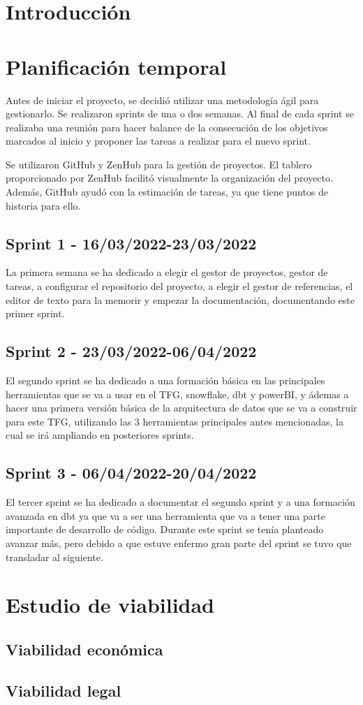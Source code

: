 
\section{Introducción}

\section{Planificación temporal}
Antes de iniciar el proyecto, se decidió utilizar una metodología ágil para gestionarlo.
Se realizaron sprints de una o dos semanas. Al final de cada sprint se realizaba una reunión para hacer balance de la consecución de los objetivos marcados al inicio y proponer las tareas a realizar para el nuevo sprint.

Se utilizaron GitHub y ZenHub para la gestión de proyectos. El tablero proporcionado por ZenHub facilitó visualmente la organización del proyecto. Además, GitHub ayudó con la estimación de tareas, ya que tiene puntos de historia para ello.

\subsection{Sprint 1 - 16/03/2022-23/03/2022}
La primera semana se ha dedicado a elegir el gestor de proyectos, gestor de tareas, a configurar el repositorio del proyecto, a elegir el gestor de referencias, el editor de texto para la memorir y empezar la documentación, documentando este primer sprint.
\subsection{Sprint 2 - 23/03/2022-06/04/2022}
El segundo sprint se ha dedicado a una formación básica en las principales herramientas que se va a usar en el TFG, snowflake, dbt y powerBI, y ádemas a hacer una primera versión básica de la arquitectura de datos que se va a construir para este TFG, utilizando las 3 herramientas principales antes mencionadas, la cual se irá ampliando en posteriores sprints. 
\subsection{Sprint 3 - 06/04/2022-20/04/2022}
El tercer sprint se ha dedicado a documentar el segundo sprint y a una formación avanzada en dbt ya que va a ser una herramienta que va a tener una parte importante de desarrollo de código. Durante este sprint se tenía planteado avanzar más, pero debido a que estuve enfermo gran parte del sprint se tuvo que transladar al siguiente.

\section{Estudio de viabilidad}



\subsection{Viabilidad económica}

\subsection{Viabilidad legal}


